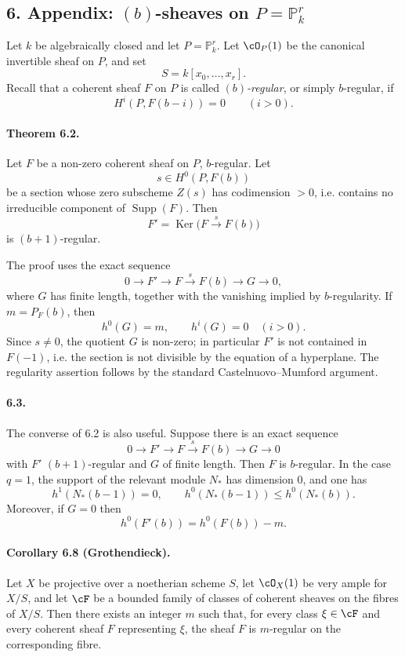 \documentclass[11pt]{article}
\theoremstyle{plain}
\theoremstyle{definition}
\theoremstyle{remark}
\newcommand{\bP}{\mathbb P}
\DeclareMathOperator{\Ker}{Ker}
\DeclareMathOperator{\Supp}{Supp}
\newcommand{\longto}{\longrightarrow}
\begin{document}
\subsection*{6. Appendix: $(b)$-sheaves on $P=\bP^r_k$}

Let $k$ be algebraically closed and let $P=\bP^r_k$. Let $\cO_P(1)$ be the canonical invertible sheaf on $P$, and set
\[
S=k[x_0,\ldots,x_r].
\]
Recall that a coherent sheaf $F$ on $P$ is called \emph{$(b)$-regular}, or simply $b$-regular, if
\[
H^i(P,F(b-i))=0\qquad (i>0).
\]

\paragraph{Theorem 6.2.}
Let $F$ be a non-zero coherent sheaf on $P$, $b$-regular. Let
\[
s\in H^0(P,F(b))
\]
be a section whose zero subscheme $Z(s)$ has codimension $>0$, i.e. contains no irreducible component of $\Supp(F)$. Then
\[
F'=\Ker\bigl(F\xrightarrow{s}F(b)\bigr)
\]
is $(b+1)$-regular.

The proof uses the exact sequence
\[
0\longto F'\longto F\xrightarrow{s}F(b)\longto G\longto 0,
\]
where $G$ has finite length, together with the vanishing implied by $b$-regularity. If $m=P_F(b)$, then
\[
h^0(G)=m,\qquad h^i(G)=0\quad (i>0).
\]
Since $s\neq 0$, the quotient $G$ is non-zero; in particular $F'$ is not contained in $F(-1)$, i.e. the section is not divisible by the equation of a hyperplane. The regularity assertion follows by the standard Castelnuovo--Mumford argument.

\paragraph{6.3.}
The converse of 6.2 is also useful. Suppose there is an exact sequence
\[
0\longto F'\longto F\xrightarrow{s}F(b)\longto G\longto 0
\]
with $F'$ $(b+1)$-regular and $G$ of finite length. Then $F$ is $b$-regular. In the case $q=1$, the support of the relevant module $N_*$ has dimension $0$, and one has
\[
h^1(N_*(b-1))=0,\qquad h^0(N_*(b-1))\leq h^0(N_*(b)).
\]
Moreover, if $G=0$ then
\[
h^0(F'(b))=h^0(F(b))-m.
\]

\paragraph{Corollary 6.8 (Grothendieck).}
Let $X$ be projective over a noetherian scheme $S$, let $\cO_X(1)$ be very ample for $X/S$, and let $\cF$ be a bounded family of classes of coherent sheaves on the fibres of $X/S$. Then there exists an integer $m$ such that, for every class $\xi\in\cF$ and every coherent sheaf $F$ representing $\xi$, the sheaf $F$ is $m$-regular on the corresponding fibre.
\end{document}
